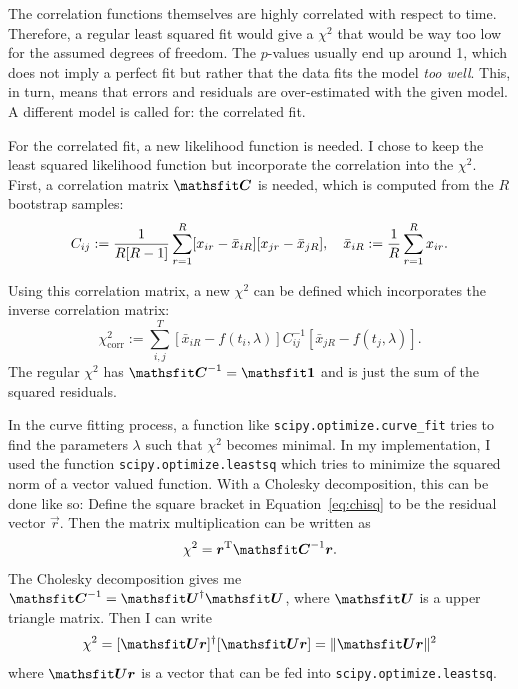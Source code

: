 \documentclass[11pt, english, fleqn, DIV=10, headinclude]{scrartcl}
\begin{document}
The correlation functions themselves are highly correlated with respect to
time. Therefore, a regular least squared fit would give a $\chi^2$ that would
be way too low for the assumed degrees of freedom. The $p$-values usually end
up around 1, which does not imply a perfect fit but rather that the data fits
the model \emph{too well}. This, in turn, means that errors and residuals are
over-estimated with the given model. A different model is called for: the
correlated fit.

For the correlated fit, a new likelihood function is needed. I chose to keep
the least squared likelihood function but incorporate the correlation into the
$\chi^2$. First, a correlation matrix $\tens C$ is needed, which is computed
from the $R$ bootstrap samples: \parencite[Section~2]{Michael:1994sz}
\begin{equation}
    \label{eq:correlation_matrix}
    C_{ij} := \frac{1}{R[R-1]} \sum_{r=1}^R
    [x_{ir} - \bar x_{iR}] [x_{jr} - \bar x_{jR}]
    ,\quad
    \bar x_{iR} := \frac 1R \sum_{r=1}^R x_{ir}.
\end{equation}

Using this correlation matrix, a new $\chi^2$ can be defined which incorporates
the inverse correlation matrix:
\begin{equation}
    \label{eq:chisq}
    \chi^2_\text{corr} := \sum_{i, j}^T
    \left[ \bar x_{iR} - f(t_i, \lambda) \right]
    C^{-1}_{ij}
    \left[ \bar x_{jR} - f(t_j, \lambda) \right].
\end{equation}
The regular $\chi^2$ has $\tens C^{-1} = \tens 1$ and is just the sum of the
squared residuals.

In the curve fitting process, a function like
\texttt{scipy.optimize.curve\_fit} tries to find the parameters $\lambda$ such
that $\chi^2$ becomes minimal. In my implementation, I used the function
\texttt{scipy.optimize.leastsq} which tries to minimize the squared norm of a
vector valued function. With a Cholesky decomposition, this can be done like
so: Define the square bracket in Equation~\eqref{eq:chisq} to be the residual
vector $\vec r$. Then the matrix multiplication can be written as
\begin{equation}
    \chi^2 = \vec r^\text T \tens C^{-1} \vec r.
\end{equation}
The Cholesky decomposition gives me $\tens C^{-1} = \tens U^\dagger \tens U$,
where $\tens U$ is a upper triangle matrix. Then I can write
\begin{equation}
    \chi^2 = [\tens U \vec r]^\dagger [\tens U \vec r]
    = \| \tens U \vec r \|^2
\end{equation}
where $\tens U \vec r$ is a vector that can be fed into
\texttt{scipy.optimize.leastsq}.
\nocite{SciPy}
\end{document}
